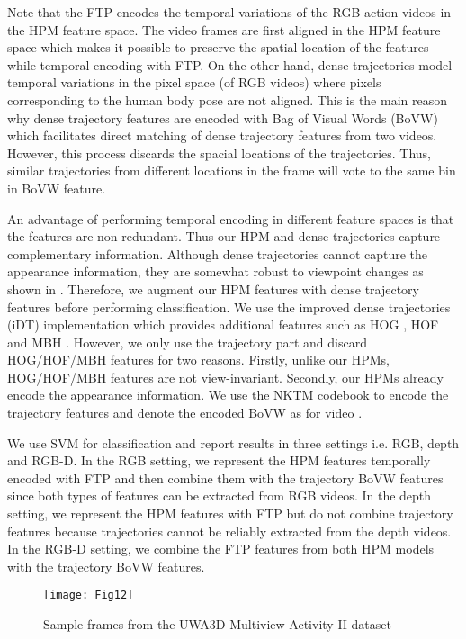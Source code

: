 \documentclass[twocolumn]{svjour3}          \smartqed  \usepackage{graphicx}
\begin{document}
Note that the FTP encodes the temporal variations of the RGB action videos in the HPM feature space. The video frames are first aligned in the  HPM feature space which makes it possible to preserve the spatial location of the features while temporal encoding with FTP. On the other hand, dense trajectories model temporal variations in the pixel space (of RGB videos) where pixels corresponding to the human body pose are not aligned. This is the main reason why dense trajectory features are encoded with Bag of Visual Words (BoVW) which facilitates direct matching of dense trajectory features from two videos. However, this process discards the spacial locations of the trajectories. Thus, similar trajectories from different locations in the frame will vote to the same bin in BoVW feature.

An advantage of performing temporal encoding in different feature spaces is that the features are non-redundant. Thus our HPM and dense trajectories capture complementary information. Although dense trajectories cannot capture the appearance information, they are somewhat robust to viewpoint changes as shown in \citep{rahmani2017learning}. Therefore, we augment our HPM features with dense trajectory features before performing classification. We use the improved dense trajectories (iDT) \citep{wang2013action} implementation which provides additional features such as HOG \citep{dalal2005histograms}, HOF and MBH \citep{dalal2006human}. However, we only use the trajectory part and discard HOG/HOF/MBH features for two reasons. Firstly, unlike our HPMs, HOG/HOF/MBH features are not view-invariant. Secondly, our HPMs already encode the appearance information. We use the NKTM \citep{NKTM} codebook to encode the trajectory features and denote the encoded BoVW as  for video .

We use SVM \citep{REF08a} for classification and report results in three settings i.e. RGB, depth and RGB-D. In the RGB setting, we represent the HPM features temporally encoded with FTP and then combine them with the trajectory BoVW features since both types of features can be extracted from RGB videos. In the depth setting, we represent the HPM features with FTP but do not combine trajectory features because trajectories cannot be reliably extracted from the depth videos. In the RGB-D setting, we combine the FTP features from both HPM models with the trajectory BoVW features.

\begin{figure}[t]
\centering
\texttt{[image: Fig12]}
\caption{Sample frames from the UWA3D Multiview Activity II dataset \citep{HOPC2016PAMI}}
\label{fig:uwa3d_sample}
\end{figure}
\end{document}
